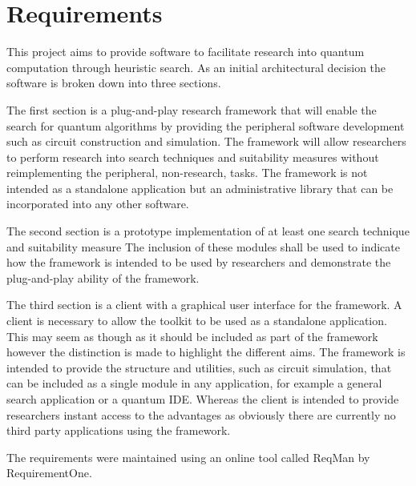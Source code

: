 \chapter{Requirements}
\label{sec:reqs}

This project aims to provide software to facilitate research into quantum computation through heuristic search.
As an initial architectural decision the software is broken down into three sections.

The first section is a plug-and-play research framework that will enable the search for quantum algorithms by providing the peripheral software development such as circuit construction and simulation.
The framework will allow researchers to perform research into search techniques and suitability measures without reimplementing the peripheral, non-research, tasks.
The framework is not intended as a standalone application but an administrative library that can be incorporated into any other software.

The second section is a prototype implementation of at least one search technique and suitability measure
The inclusion of these modules shall be used to indicate how the framework is intended to be used by researchers and demonstrate the plug-and-play ability of the framework.

The third section is a client with a graphical user interface for the framework.
A client is necessary to allow the toolkit to be used as a standalone application.
This may seem as though as it should be included as part of the framework however the distinction is made to highlight the different aims.
The framework is intended to provide the structure and utilities, such as circuit simulation, that can be included as a single module in any application, for example a general search application or a quantum IDE.
Whereas the client is intended to provide researchers instant access to the advantages as obviously there are currently no third party applications using the framework.

The requirements were maintained using an online tool called ReqMan by RequirementOne\cite{reqman}.

